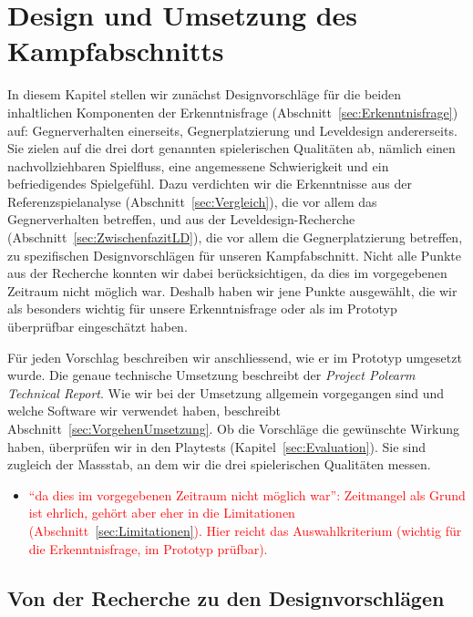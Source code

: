 \documentclass[../Main.tex]{subfiles}
\begin{document}
\section{Design und Umsetzung des Kampfabschnitts} \label{sec:Umsetzung}

In diesem Kapitel stellen wir zunächst Designvorschläge für die beiden inhaltlichen Komponenten der Erkenntnisfrage (Abschnitt~\ref{sec:Erkenntnisfrage}) auf: Gegnerverhalten einerseits, Gegnerplatzierung und Leveldesign andererseits. Sie zielen auf die drei dort genannten spielerischen Qualitäten ab, nämlich einen nachvollziehbaren Spielfluss, eine angemessene Schwierigkeit und ein befriedigendes Spielgefühl. Dazu verdichten wir die Erkenntnisse aus der Referenzspielanalyse (Abschnitt~\ref{sec:Vergleich}), die vor allem das Gegnerverhalten betreffen, und aus der Leveldesign-Recherche (Abschnitt~\ref{sec:ZwischenfazitLD}), die vor allem die Gegnerplatzierung betreffen, zu spezifischen Designvorschlägen für unseren Kampfabschnitt. Nicht alle Punkte aus der Recherche konnten wir dabei berücksichtigen, da dies im vorgegebenen Zeitraum nicht möglich war. Deshalb haben wir jene Punkte ausgewählt, die wir als besonders wichtig für unsere Erkenntnisfrage oder als im Prototyp überprüfbar eingeschätzt haben.

Für jeden Vorschlag beschreiben wir anschliessend, wie er im Prototyp umgesetzt wurde. Die genaue technische Umsetzung beschreibt der \textit{Project Polearm Technical Report}. Wie wir bei der Umsetzung allgemein vorgegangen sind und welche Software wir verwendet haben, beschreibt Abschnitt~\ref{sec:VorgehenUmsetzung}. Ob die Vorschläge die gewünschte Wirkung haben, überprüfen wir in den Playtests (Kapitel~\ref{sec:Evaluation}). Sie sind zugleich der Massstab, an dem wir die drei spielerischen Qualitäten messen.

\begin{itemize}[leftmargin=1.5cm]
    \item \textcolor{red}{\enquote{da dies im vorgegebenen Zeitraum nicht möglich war}: Zeitmangel als Grund ist ehrlich, gehört aber eher in die Limitationen (Abschnitt~\ref{sec:Limitationen}). Hier reicht das Auswahlkriterium (wichtig für die Erkenntnisfrage, im Prototyp prüfbar).}
\end{itemize}

\subsection{Von der Recherche zu den Designvorschlägen} \label{sec:Designvorschlaege}
\end{document}
